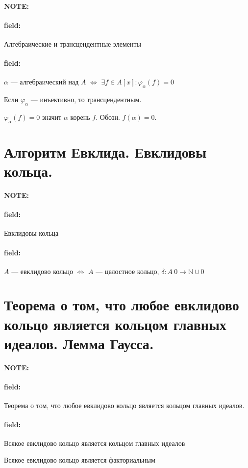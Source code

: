 \documentclass[12pt]{article}
\newenvironment{note}{\paragraph{NOTE:}}{}
\newenvironment{field}{\paragraph{field:}}{}
\begin{document}
\begin{note}
  \begin{field}
    Алгебраические и трансцендентные элементы
  \end{field}
  \begin{field}
    $\alpha$ --- алгебраический над $A$
    $\Leftrightarrow$
    $\exists f \in A[x]: \varphi_{\alpha}(f) = 0$

    Если $\varphi_{\alpha}$ --- инъективно, то трансцендентным.

    $\varphi_{\alpha} (f) = 0$ значит $\alpha$ корень $f$. Обозн. $f(\alpha) = 0$.
  \end{field}
\end{note}

\section{Алгоритм Евклида. Евклидовы кольца.}


\begin{note}
  \begin{field}
    Евклидовы кольца
  \end{field}
  \begin{field}
    $A$ --- евклидово кольцо
    $\Leftrightarrow$
    $A$ --- целостное кольцо,
    $\delta : A \ {0} \rightarrow \mathbb{N} \cup {0}$
  \end{field}
\end{note}

\section{Теорема о том, что любое евклидово кольцо является кольцом главных
  идеалов. Лемма Гаусса.}

\begin{note}
  \begin{field}
    Теорема о том, что любое евклидово кольцо является кольцом главных
    идеалов.
  \end{field}
  \begin{field}
    Всякое евклидово кольцо является кольцом главных идеалов

    Всякое евклидово кольцо является факториальным
  \end{field}
\end{note}
\end{document}
